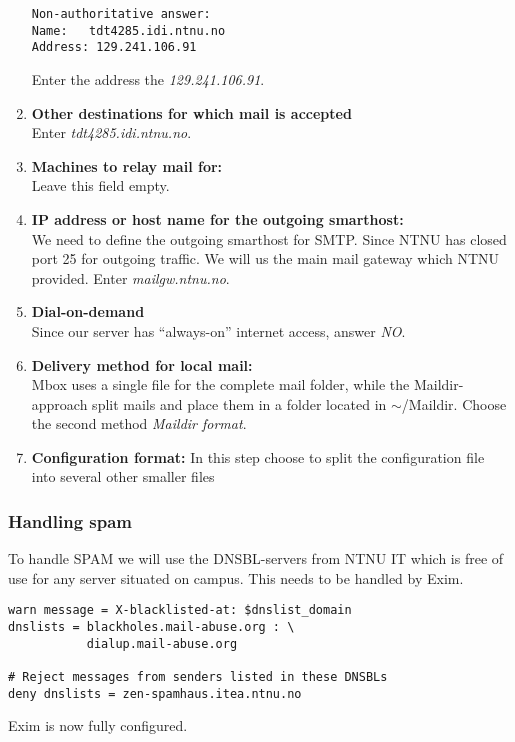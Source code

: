 \begin{enumerate}
\begin{lstlisting}
Non-authoritative answer:
Name:	tdt4285.idi.ntnu.no
Address: 129.241.106.91
\end{lstlisting}
Enter the address the \emph{129.241.106.91}.
\item\textbf{Other destinations for which mail is accepted}\\
Enter \emph{tdt4285.idi.ntnu.no}.
\item\textbf{Machines to relay mail for:}\\
Leave this field empty.
\item\textbf{IP address or host name for the outgoing smarthost:}\\
We need to define the outgoing smarthost for SMTP. Since NTNU has closed
port 25 for outgoing traffic. We will us the main mail gateway which
NTNU provided. Enter \emph{mailgw.ntnu.no}.
\item\textbf{Dial-on-demand}\\
Since our server has ``always-on'' internet access, answer \emph{NO}.
\item\textbf{Delivery method for local mail:}\\
Mbox uses a single file for the complete mail folder, while the
Maildir-approach split mails and place them in a folder located in
$\sim$/Maildir. Choose the second method \emph{Maildir format}.
\item\textbf{Configuration format:}
In this step choose to split the configuration file into several other
smaller files
\end{enumerate}

\subsubsection{Handling spam}
To handle SPAM we will use the DNSBL-servers from NTNU IT which is free of use
for any server situated on campus. This needs to be handled by Exim.

\begin{lstlisting}
warn message = X-blacklisted-at: $dnslist_domain
dnslists = blackholes.mail-abuse.org : \
           dialup.mail-abuse.org

# Reject messages from senders listed in these DNSBLs
deny dnslists = zen-spamhaus.itea.ntnu.no
\end{lstlisting}
Exim is now fully configured.

